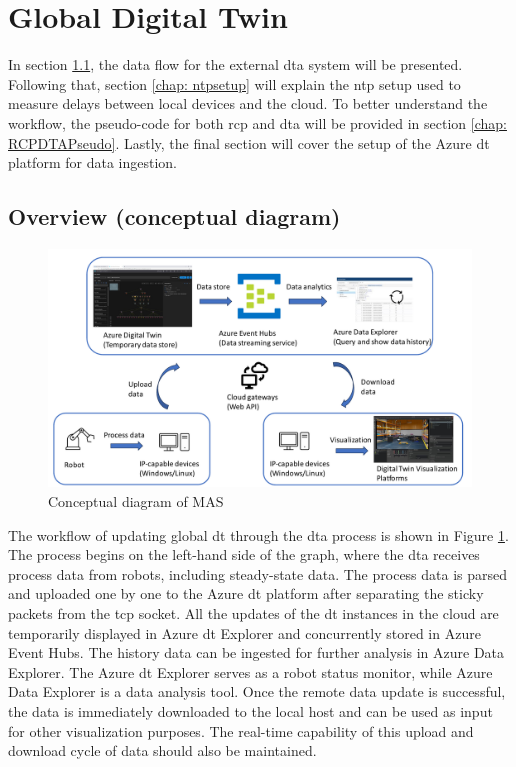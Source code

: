 \section{Global Digital Twin} \label{chap: Meth-External}
In section \ref{chap: Overview-External}, the data flow for the external 
\gls{dta} system will be presented. Following that, section \ref{chap: ntpsetup} 
will explain the \gls{ntp} setup used to measure delays between local devices and 
the cloud. To better understand the workflow, the pseudo-code for both \gls{rcp} 
and \gls{dta} will be provided in section \ref{chap: RCPDTAPseudo}. Lastly, the 
final section will cover the setup of the Azure \gls{dt} platform for data ingestion.



\subsection{Overview (conceptual diagram)}\label{chap: Overview-External}

\begin{figure}[htb]
\includegraphics[width=\textwidth]{figures/DT_Conceptual_Diagram.pdf}

\centering
\caption{Conceptual diagram of MAS\label{fig: DTConceptual}}
\end{figure}

The workflow of updating global \gls{dt} through the \gls{dta} process is shown 
in Figure \ref{fig: DTConceptual}. The process begins on the left-hand side of the 
graph, where the \gls{dta} receives process data from robots, including steady-state 
data. The process data is parsed and uploaded one by one to the Azure \gls{dt} 
platform after separating the sticky packets from the \gls{tcp} socket.
All the updates of the \gls{dt} instances in the cloud are temporarily displayed 
in Azure \gls{dt} Explorer and concurrently stored in Azure Event Hubs. The history 
data can be ingested for further analysis in Azure Data Explorer. The Azure \gls{dt} 
Explorer serves as a robot status monitor, while Azure Data Explorer is a data analysis tool.
Once the remote data update is successful, the data is immediately downloaded to the local 
host and can be used as input for other visualization purposes. The real-time capability 
of this upload and download cycle of data should also be maintained.

